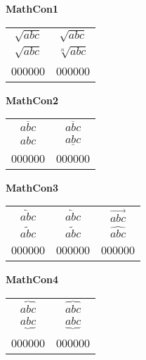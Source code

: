 \documentclass[12pt]{report}
\newlength{\mine}
\newlength{\niz}
\def\pmb{}
\begin{document}
\newpage

\textbf{MathCon1}
\par\nobreak\vspace{2mm}
\begin{tabular}{|c|c|}
  \hline \rule{0pt}{7mm}
   $\pmb{\sqrt{abc} }$&
   $\pmb{\sqrt{abc} }$\\[\mine]
   $\pmb{\sqrt{abc} }$&
   $\pmb{\sqrt[n]{abc} }$\\[\niz]
  \hline\hline
  000000&000000\\
  \hline
\end{tabular}
\goodbreak\par\vspace{3mm}

\textbf{MathCon2}
\par\nobreak\vspace{2mm}
\begin{tabular}{|c|c|}
  \hline \rule{0pt}{7mm}
   $\pmb{\overline{abc} }$&
   $\pmb{\overline{abc} }$\\[\mine]
   $\pmb{abc }$&
   $\pmb{\underline{abc} }$\\[\niz]
  \hline\hline
  000000&000000\\
  \hline
\end{tabular}
\goodbreak\par\vspace{3mm}

\textbf{MathCon3}
\par\nobreak\vspace{2mm}
\begin{tabular}{|c|cc|}
  \hline \rule{0pt}{7mm}
   $\pmb{\overleftarrow{abc} }$&
   $\pmb{\overleftarrow{abc} }$&
   $\pmb{\overrightarrow{abc} }$\\[\mine]
   $\pmb{\widetilde{abc} }$&
   $\pmb{\widetilde{abc} }$&
   $\pmb{\widehat{abc} }$\\[\niz]
  \hline\hline
  000000&000000&000000\\
  \hline
\end{tabular}
\goodbreak\par\vspace{3mm}

\textbf{MathCon4}
\par\nobreak\vspace{2mm}
\begin{tabular}{|c|c|}
  \hline \rule{0pt}{7mm}
   $\pmb{\overbrace{abc} }$&
   $\pmb{\overbrace{abc} }$\\[\mine]
   $\pmb{\underbrace{abc} }$&
   $\pmb{\underbrace{abc} }$\\[\niz]
  \hline\hline
  000000&000000\\
  \hline
\end{tabular}
\goodbreak\par\vspace{3mm}
\end{document}
